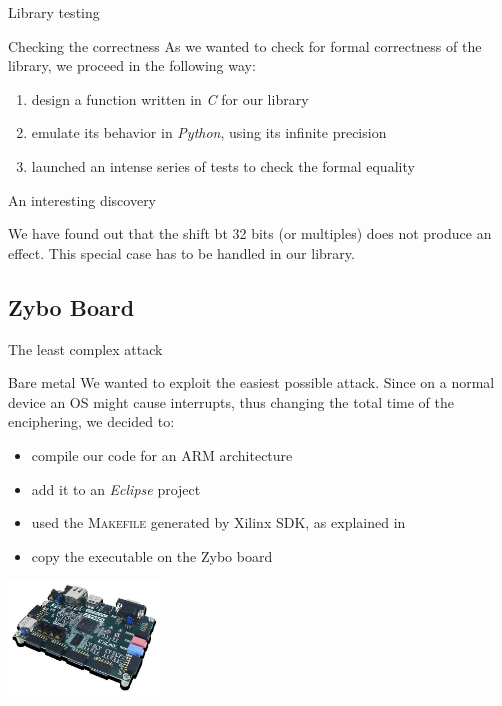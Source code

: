 \documentclass{beamer}
\begin{document}
\begin{frame}{Library testing}
  \begin{block}{Checking the correctness}
    As we wanted to check for formal correctness of the library, we proceed in the following way:
    \begin{enumerate}
      \pause \item design a function written in \textit{C} for our library
      \pause \item emulate its behavior in \textit{Python}, using its infinite precision
      \pause \item launched an intense series of tests to check the formal equality
    \end{enumerate}
  \end{block}

  \pause
  \begin{alert}{An interesting discovery}

    We have found out that the shift bt 32 bits (or multiples) does not produce an effect. This special case has to be handled in our library.
  \end{alert}
\end{frame}

\subsection{Zybo Board}
\begin{frame}{The least complex attack}
	\begin{block}{Bare metal}
		We wanted to exploit the easiest possible attack. Since on a normal device an OS might cause interrupts, thus changing the total time of the enciphering, we decided to:
		\begin{itemize}
			\pause \item compile our code for an ARM architecture
			\pause \item add it to an \textit{Eclipse} project
			\pause \item used the \textsc{Makefile} generated by Xilinx SDK, as explained in \cite{xilinx2015zynq}
			\pause \item copy the executable on the Zybo board
		\end{itemize}
    \begin{center}
      \includegraphics[width=4cm]{./graphics/zybo}
    \end{center}
	\end{block}
\end{frame}
\end{document}
